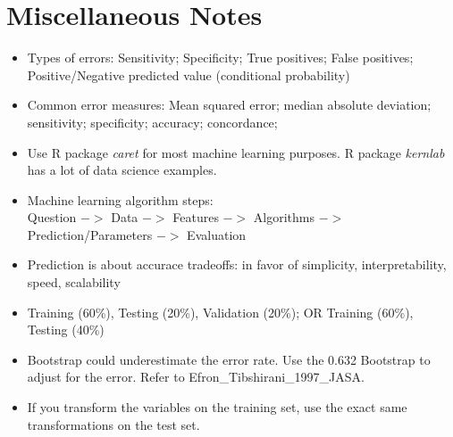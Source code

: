 \documentclass[11pt]{extarticle} %
\begin{document}
\section{Miscellaneous Notes}
\begin{itemize}
\item Types of errors: Sensitivity; Specificity; True positives; False positives; Positive/Negative predicted value (conditional probability)
\item Common error measures: Mean squared error; median absolute deviation; sensitivity; specificity; accuracy; concordance;
\item Use R package {\emph{caret}} for most machine learning purposes. R package {\emph{kernlab}} has a lot of data science examples. 
\item Machine learning algorithm steps: \\ Question $->$ Data $->$ Features $->$ Algorithms $->$ Prediction/Parameters $->$ Evaluation
\item Prediction is about accurace tradeoffs: in favor of simplicity, interpretability, speed, scalability
\item Training (60\%), Testing (20\%), Validation (20\%); OR Training (60\%), Testing (40\%)
\item Bootstrap could underestimate the error rate. Use the 0.632 Bootstrap to adjust for the error. Refer to Efron\_Tibshirani\_1997\_JASA.
\item If you transform the variables on the training set, use the exact same transformations on the test set.
\end{itemize}
\end{document}
